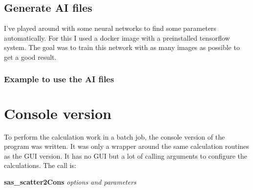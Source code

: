\documentclass[11pt]{article} %
\begin{document}
\clearpage
\subsection{Generate AI files}

I've played around with some neural networks to find some parameters automatically. For this I used a docker image with a preinstalled tensorflow system. The goal was to train this network with as many images as possible to get a good result.

\subsubsection{Example to use the AI files}



\clearpage
\section{Console version}

To perform the calculation work in a batch job, the console version of the program was written. It was only a wrapper around the same calculation routines as the GUI version. It has no GUI but a lot of calling arguments to configure the calculations. The call is: \\
\centerline{{\bf sas\_scatter2Cons} {\it options and parameters}}
\end{document}
